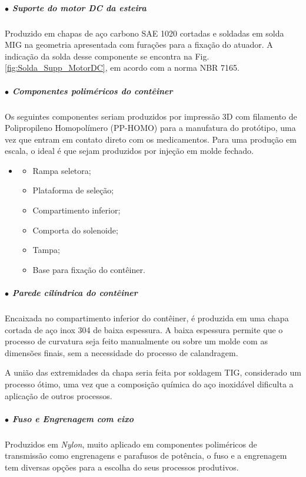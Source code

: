 \subparagraph*{$\bullet$ Suporte do motor DC da esteira} \hfill

Produzido em chapas de aço carbono SAE 1020 cortadas e soldadas em solda MIG na geometria apresentada com furações para a fixação do atuador. A indicação da solda desse componente se encontra na Fig. \ref{fig:Solda_Supp_MotorDC}, em acordo com a norma NBR 7165.

\subparagraph*{$\bullet$ Componentes poliméricos do contêiner} \hfill

Os seguintes componentes seriam produzidos por impressão 3D com filamento de Polipropileno Homopolímero (PP-HOMO) para a manufatura do protótipo, uma vez que entram em contato direto com os medicamentos. Para uma produção em escala, o ideal é que sejam produzidos por injeção em molde fechado.

\begin{itemize}
\item []
   \begin{itemize}
        \item Rampa seletora;
        \item Plataforma de seleção;
        \item Compartimento inferior;
         \item Comporta do solenoide;
        \item Tampa;
        \item Base para fixação do contêiner.
   \end{itemize}
\end{itemize}

\subparagraph*{$\bullet$ Parede cilíndrica do contêiner} \hfill 

Encaixada no compartimento inferior do contêiner, é produzida em uma chapa cortada de aço inox 304 de baixa espessura. A baixa espessura permite que o processo de curvatura seja feito manualmente ou sobre um molde com as dimensões finais, sem a necessidade do processo de calandragem.

A união das extremidades da chapa seria feita por soldagem TIG, considerado um processo ótimo, uma vez que a composição química do aço inoxidável dificulta a aplicação de outros processos.

\subparagraph*{$\bullet$ Fuso e Engrenagem com eixo} \hfill

Produzidos em \textit{Nylon}, muito aplicado em componentes poliméricos de transmissão como engrenagens e parafusos de potência, o fuso e a engrenagem tem diversas opções para a escolha do seus processos produtivos.

